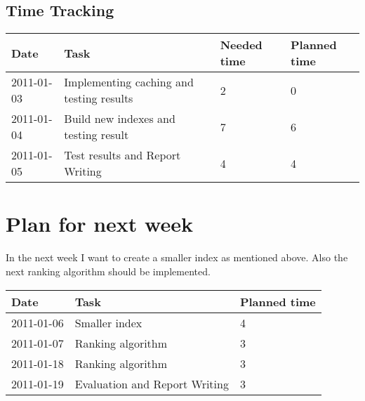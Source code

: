 \documentclass[11pt, accentcolor=tud9b, nochapname]{tudexercise}
\begin{document}
\subsection{Time Tracking}

\begin{tabular}{l | l | l | l}
  \hline
  \textbf{Date} & \textbf{Task} & \textbf{Needed time} & \textbf{Planned time} \\ \hline
  2011-01-03 & Implementing caching and testing results & 2 & 0 \\ \hline
  2011-01-04 & Build new indexes and testing result & 7 & 6 \\ \hline
  2011-01-05 & Test results and Report Writing & 4 & 4  \\ \hline
\end{tabular}

\section{Plan for next week}
In the next week I want to create a smaller index as mentioned above. Also the next ranking algorithm should be implemented.

\vspace{10pt}
\begin{tabular}{l | l | l}
  \hline
  \textbf{Date} & \textbf{Task} & \textbf{Planned time} \\ \hline
  2011-01-06 & Smaller index & 4 \\ \hline
  2011-01-07 & Ranking algorithm & 3 \\ \hline
  2011-01-18 & Ranking algorithm & 3 \\ \hline
  2011-01-19 & Evaluation and Report Writing & 3 \\ \hline
\end{tabular}
\end{document}

